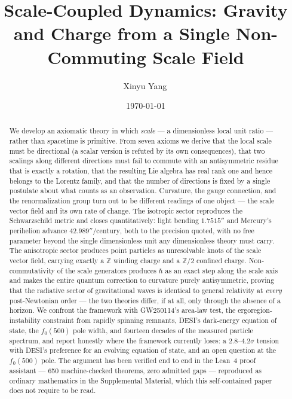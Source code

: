 \documentclass[aps,prd,twocolumn,superscriptaddress,nofootinbib]{revtex4-2}
\newcommand{\SM}{Supplemental Material}
\begin{document}
\title{Scale-Coupled Dynamics: Gravity and Charge from a Single Non-Commuting Scale Field}

\author{Xinyu Yang\,}
\noaffiliation

\date{\today}

\begin{abstract}
We develop an axiomatic theory in which \emph{scale} — a dimensionless
local unit ratio — rather than spacetime is primitive. From seven axioms
we derive that the local scale must be directional (a scalar version is
refuted by its own consequences), that two scalings along different
directions must fail to commute with an antisymmetric residue that is
exactly a rotation, that the resulting Lie algebra has real rank one and
hence belongs to the Lorentz family, and that the number of directions is
fixed by a single postulate about what counts as an observation.
Curvature, the gauge connection, and the renormalization group turn out
to be different readings of one object — the scale vector field and its
own rate of change. The isotropic sector reproduces the Schwarzschild
metric and closes quantitatively: light bending $1.7515''$ and Mercury's
perihelion advance $42.989''/\mathrm{century}$, both to the precision
quoted, with no free parameter beyond the single dimensionless unit any
dimensionless theory must carry. The anisotropic sector produces point
particles as unresolvable knots of the scale vector field, carrying
exactly a $\mathbb{Z}$ winding charge and a $\mathbb{Z}/2$ confined
charge. Non-commutativity of the scale generators produces $\hbar$ as an
exact step along the scale axis and makes the entire quantum correction
to curvature purely antisymmetric, proving that the radiative sector of
gravitational waves is identical to general relativity at \emph{every}
post-Newtonian order — the two theories differ, if at all, only through
the absence of a horizon. We confront the framework with GW250114's
area-law test, the ergoregion-instability constraint from rapidly
spinning remnants, DESI's dark-energy equation of state, the $f_0(500)$
pole width, and fourteen decades of the measured particle spectrum, and
report honestly where the framework currently loses: a
$2.8$–$4.2\sigma$ tension with DESI's preference for an evolving equation
of state, and an open question at the $f_0(500)$ pole. The argument has
been verified end to end in the Lean~4 proof assistant — 650
machine-checked theorems, zero admitted gaps — reproduced as ordinary
mathematics in the \SM, which this self-contained paper does not require
to be read.
\end{abstract}
\end{document}
